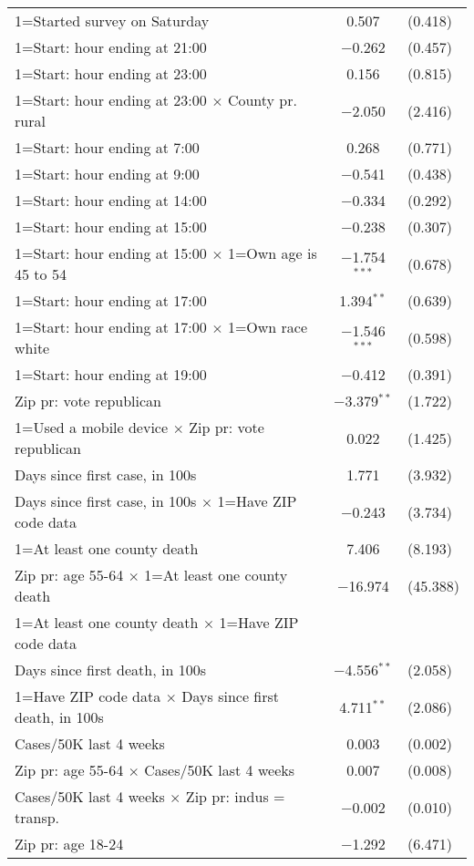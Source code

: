 \begin{table}[!htbp]
\begin{tabular}{@{\extracolsep{5pt}}lc}
  1=Started survey on Saturday & 0.507 & (0.418) \\ 
  1=Start: hour ending at 21:00 & $-$0.262 & (0.457) \\ 
  1=Start: hour ending at 23:00 & 0.156 & (0.815) \\ 
  1=Start: hour ending at 23:00 $\times$ County pr. rural & $-$2.050 & (2.416) \\ 
  1=Start: hour ending at 7:00 & 0.268 & (0.771) \\ 
  1=Start: hour ending at 9:00 & $-$0.541 & (0.438) \\ 
  1=Start: hour ending at 14:00 & $-$0.334 & (0.292) \\ 
  1=Start: hour ending at 15:00 & $-$0.238 & (0.307) \\ 
  1=Start: hour ending at 15:00 $\times$ 1=Own age is 45 to 54 & $-$1.754$^{***}$ & (0.678) \\ 
  1=Start: hour ending at 17:00 & 1.394$^{**}$ & (0.639) \\ 
  1=Start: hour ending at 17:00 $\times$ 1=Own race white & $-$1.546$^{***}$ & (0.598) \\ 
  1=Start: hour ending at 19:00 & $-$0.412 & (0.391) \\ 
  Zip pr: vote republican & $-$3.379$^{**}$ & (1.722) \\ 
  1=Used a mobile device $\times$ Zip pr: vote republican & 0.022 & (1.425) \\ 
  Days since first case, in 100s & 1.771 & (3.932) \\ 
  Days since first case, in 100s $\times$ 1=Have ZIP code data & $-$0.243 & (3.734) \\ 
  1=At least one county death & 7.406 & (8.193) \\ 
  Zip pr: age 55-64 $\times$ 1=At least one county death & $-$16.974 & (45.388) \\ 
  1=At least one county death $\times$ 1=Have ZIP code data &  \\ 
  Days since first death, in 100s & $-$4.556$^{**}$ & (2.058) \\ 
  1=Have ZIP code data $\times$ Days since first death, in 100s & 4.711$^{**}$ & (2.086) \\ 
  Cases/50K last 4 weeks & 0.003 & (0.002) \\ 
  Zip pr: age 55-64 $\times$ Cases/50K last 4 weeks & 0.007 & (0.008) \\ 
  Cases/50K last 4 weeks $\times$ Zip pr: indus = transp. & $-$0.002 & (0.010) \\ 
  Zip pr: age 18-24 & $-$1.292 & (6.471) \\ 

\end{tabular}
\end{table}
